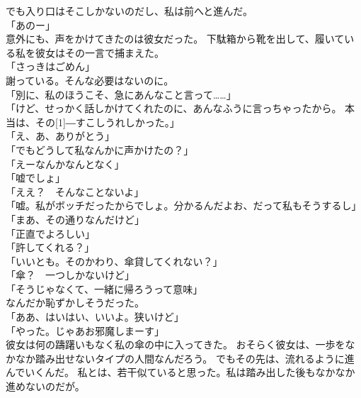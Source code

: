 \documentclass[../IHMain]{subfiles}
\begin{document}
でも入り口はそこしかないのだし、私は前へと進んだ。\\
「あのー」\\
意外にも、声をかけてきたのは彼女だった。
下駄箱から靴を出して、履いている私を彼女はその一言で捕まえた。\\
「さっきはごめん」\\
謝っている。そんな必要はないのに。\\
「別に、私のほうこそ、急にあんなこと言って……」\\
「けど、せっかく話しかけてくれたのに、あんなふうに言っちゃったから。
本当は、その\scalebox{3}[1]{―}すこしうれしかった。」\\
「え、あ、ありがとう」\\
「でもどうして私なんかに声かけたの？」\\
「えーなんかなんとなく」\\
「嘘でしょ」\\
「ええ？　そんなことないよ」\\
「嘘。私がボッチだったからでしょ。分かるんだよお、だって私もそうするし」\\
「まあ、その通りなんだけど」\\
「正直でよろしい」\\
「許してくれる？」\\
「いいとも。そのかわり、傘貸してくれない？」\\
「傘？　一つしかないけど」\\
「そうじゃなくて、一緒に帰ろうって意味」\\
なんだか恥ずかしそうだった。\\
「ああ、はいはい、いいよ。狭いけど」\\
「やった。じゃあお邪魔しまーす」\\
彼女は何の躊躇いもなく私の傘の中に入ってきた。
おそらく彼女は、一歩をなかなか踏み出せないタイプの人間なんだろう。
でもその先は、流れるように進んでいくんだ。
私とは、若干似ていると思った。私は踏み出した後もなかなか進めないのだが。
\end{document}
